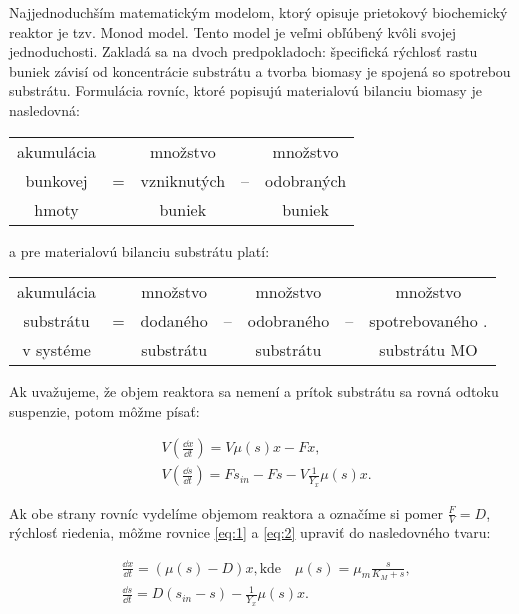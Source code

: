 Najjednoduchším matematickým modelom, ktorý opisuje prietokový biochemický reaktor je tzv. Monod model. Tento model je veľmi obľúbený kvôli svojej jednoduchosti. Zakladá sa na dvoch predpokladoch:  špecifická rýchlosť rastu buniek závisí od koncentrácie substrátu a   tvorba biomasy je spojená so spotrebou substrátu. Formulácia rovníc, ktoré popisujú materialovú bilanciu biomasy je nasledovná:
\begin{table}[H]
	\centering
	\begin{tabular}{ccccc}
		akumulácia & & množstvo & & množstvo \\
		bunkovej & = & vzniknutých & -- & odobraných \\
		hmoty & & buniek & & buniek \\
	\end{tabular}
\end{table}
\noindent a pre materialovú bilanciu substrátu platí:
\begin{table}[H]
	\centering
	\begin{tabular}{ccccccc}
		akumulácia & & množstvo & & množstvo & & množstvo\\
		substrátu & = & dodaného & -- & odobraného & -- & spotrebovaného .\\
		v systéme & & substrátu & & substrátu & & substrátu MO\\
	\end{tabular}
\end{table}
\noindent Ak uvažujeme, že objem reaktora sa nemení a prítok substrátu sa rovná odtoku suspenzie, potom môžme písať: 

\begin{align}
	&V\left(\frac{\dd x}{\dd t}\right) = V\mu(s)x - Fx, \label{eq:1} \\
	&V\left(\frac{\dd s}{\dd t}\right) = Fs_{in} - Fs - V\frac{1}{Y_{x}}\mu(s)x. \label{eq:2}
\end{align}

\noindent Ak obe strany rovníc vydelíme objemom reaktora a označíme si pomer $\frac{F}{V} = D$, rýchlosť riedenia, môžme rovnice \ref{eq:1} a \ref{eq:2} upraviť do nasledovného tvaru:

\begin{align} 
	&\frac{\dd x}{\dd t} = \left(\mu(s) - D\right)x, \text{kde}  \quad \mu(s) = \mu_{m}\frac{s}{K_{M} + s}, \label{eq:3} \\
	&\frac{\dd s}{\dd t} = D\left(s_{in} - s\right) - \frac{1}{Y_{x}}\mu(s)x. \label{eq:4}
\end{align}

